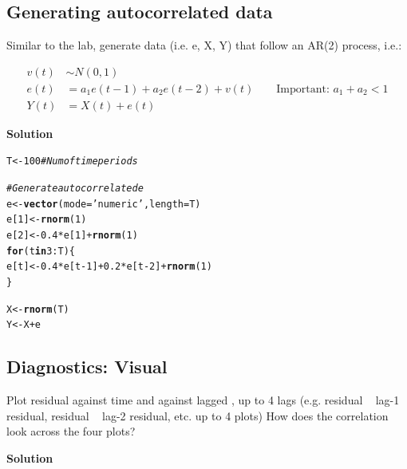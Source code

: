 \documentclass{article}\usepackage[]{graphicx}\usepackage[]{color}
\makeatletter
\newcommand{\hlnum}[1]{\textcolor[rgb]{0.686,0.059,0.569}{#1}}%
\newcommand{\hlstr}[1]{\textcolor[rgb]{0.192,0.494,0.8}{#1}}%
\newcommand{\hlcom}[1]{\textcolor[rgb]{0.678,0.584,0.686}{\textit{#1}}}%
\newcommand{\hlopt}[1]{\textcolor[rgb]{0,0,0}{#1}}%
\newcommand{\hlstd}[1]{\textcolor[rgb]{0.345,0.345,0.345}{#1}}%
\newcommand{\hlkwa}[1]{\textcolor[rgb]{0.161,0.373,0.58}{\textbf{#1}}}%
\newcommand{\hlkwb}[1]{\textcolor[rgb]{0.69,0.353,0.396}{#1}}%
\newcommand{\hlkwc}[1]{\textcolor[rgb]{0.333,0.667,0.333}{#1}}%
\newcommand{\hlkwd}[1]{\textcolor[rgb]{0.737,0.353,0.396}{\textbf{#1}}}%
\newenvironment{kframe}{%
 \def\at@end@of@kframe{}%
 \ifinner\ifhmode%
  \def\at@end@of@kframe{\end{minipage}}%
  \begin{minipage}{\columnwidth}%
 \fi\fi%
 \def\FrameCommand##1{\hskip\@totalleftmargin \hskip-\fboxsep
 \colorbox{shadecolor}{##1}\hskip-\fboxsep
     \hskip-\linewidth \hskip-\@totalleftmargin \hskip\columnwidth}%
 \MakeFramed {\advance\hsize-\width
   \@totalleftmargin\z@ \linewidth\hsize
   \@setminipage}}%
 {\par\unskip\endMakeFramed%
 \at@end@of@kframe}
\newenvironment{knitrout}{}{} %
\makeatother
\begin{document}
\subsection{Generating autocorrelated data}

Similar to the lab, generate data (i.e. e, X, Y) that follow an AR(2) process, i.e.:

\begin{align}
v(t) &\sim N(0, 1) \\
e(t) &= a_1e(t-1) + a_2 e(t-2) + v(t) \qquad \text{Important: $a_1 + a_2 < 1$} \\
Y(t) &= X(t) + e(t)
\end{align}

\textbf{Solution}

\begin{knitrout}
\color{fgcolor}\begin{kframe}
\begin{alltt}
\hlstd{T} \hlkwb{<-} \hlnum{100} \hlcom{# Num of time periods}

\hlcom{# Generate autocorrelated e}
\hlstd{e} \hlkwb{<-} \hlkwd{vector}\hlstd{(}\hlkwc{mode} \hlstd{=} \hlstr{'numeric'}\hlstd{,} \hlkwc{length} \hlstd{= T)}
\hlstd{e[}\hlnum{1}\hlstd{]} \hlkwb{<-} \hlkwd{rnorm}\hlstd{(}\hlnum{1}\hlstd{)}
\hlstd{e[}\hlnum{2}\hlstd{]} \hlkwb{<-} \hlnum{0.4} \hlopt{*} \hlstd{e[}\hlnum{1}\hlstd{]} \hlopt{+} \hlkwd{rnorm}\hlstd{(}\hlnum{1}\hlstd{)}
\hlkwa{for} \hlstd{(t} \hlkwa{in} \hlnum{3}\hlopt{:}\hlstd{T) \{}
  \hlstd{e[t]} \hlkwb{<-} \hlnum{0.4} \hlopt{*} \hlstd{e[t} \hlopt{-} \hlnum{1}\hlstd{]} \hlopt{+} \hlnum{0.2} \hlopt{*} \hlstd{e[t} \hlopt{-} \hlnum{2}\hlstd{]} \hlopt{+} \hlkwd{rnorm}\hlstd{(}\hlnum{1}\hlstd{)}
\hlstd{\}}

\hlstd{X} \hlkwb{<-} \hlkwd{rnorm}\hlstd{(T)}
\hlstd{Y} \hlkwb{<-} \hlstd{X} \hlopt{+} \hlstd{e}
\end{alltt}
\end{kframe}
\end{knitrout}

\subsection{Diagnostics: Visual}

Plot residual against time and against lagged , up to 4 lags (e.g. residual ~ lag-1 residual, residual ~ lag-2 residual, etc. up to 4 plots) How does the correlation look across the four plots?

\textbf{Solution}
\end{document}
